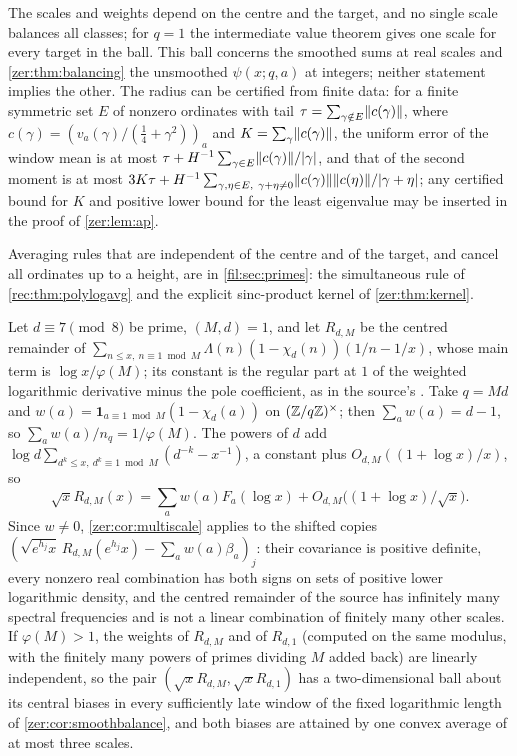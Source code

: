 The scales and weights depend on the centre and the target, and no single scale balances all
classes; for $q=1$ the intermediate value theorem gives one scale for every target in the
ball. This ball concerns the smoothed sums at real scales and \cref{zer:thm:balancing} the
unsmoothed $\psi(x;q,a)$ at integers; neither statement implies the other. The radius can be
certified from finite data: for a finite symmetric set $E$ of nonzero ordinates with tail
$\tau=\sum_{\gamma\notin E}\lVert c(\gamma)\rVert$, where $c(\gamma)=(v_a(\gamma)/(\tfrac14+\gamma^2))_a$ and
$K=\sum_\gamma\lVert c(\gamma)\rVert$, the uniform error of the window mean is at most
$\tau+H^{-1}\sum_{\gamma\in E}\lVert c(\gamma)\rVert/\lvert\gamma\rvert$, and that of the second moment is at most
$3K\tau+H^{-1}\sum_{\gamma,\eta\in E,\ \gamma+\eta\ne0}\norm{c(\gamma)}\norm{c(\eta)}/\abs{\gamma+\eta}$; any
certified bound for $K$ and positive lower bound for the least eigenvalue may be inserted in
the proof of \cref{zer:lem:ap}.

Averaging rules that are independent of the centre and of the target, and cancel all ordinates up
to a height, are in \cref{fil:sec:primes}: the simultaneous rule of \cref{rec:thm:polylogavg} and the
explicit sinc-product kernel of \cref{zer:thm:kernel}.

\begin{remark}\label{zer:rem:sourceremainder}
Let $d\equiv7\pmod8$ be prime, $(M,d)=1$, and let $R_{d,M}$ be the centred remainder of
$\sum_{n\le x,\ n\equiv1\bmod M}\Lambda(n)(1-\chi_d(n))(1/n-1/x)$, whose main term is
$\log x/\varphi(M)$; its constant is the regular part at $1$ of the weighted logarithmic
derivative minus the pole coefficient, as in the source's . Take $q=Md$ and
$w(a)=\mathbf 1_{a\equiv1\bmod M}(1-\chi_d(a))$ on $(\mathbb{Z}/q\mathbb{Z})^\times$; then $\sum_aw(a)=d-1$, so
$\sum_aw(a)/n_q=1/\varphi(M)$. The powers of $d$ add
$\log d\sum_{d^k\le x,\ d^k\equiv1\bmod M}(d^{-k}-x^{-1})$, a constant plus $O_{d,M}((1+\log x)/x)$, so
\[
 \sqrt xR_{d,M}(x)=\sum_aw(a)F_a(\log x)+O_{d,M}\bigl((1+\log x)/\sqrt x\bigr).
\]
Since $w\ne0$, \cref{zer:cor:multiscale} applies to the shifted copies
$(\sqrt{e^{h_j}x}\,R_{d,M}(e^{h_j}x)-\sum_aw(a)\beta_a)_j$: their covariance is positive definite,
every nonzero real combination has both signs on sets of positive lower logarithmic density,
and the centred remainder of the source has infinitely many spectral frequencies and is not a
linear combination of finitely many other scales. If $\varphi(M)>1$, the weights of $R_{d,M}$ and
of $R_{d,1}$ (computed on the same modulus, with the finitely many powers of primes dividing $M$
added back) are linearly independent, so the pair $(\sqrt xR_{d,M},\sqrt xR_{d,1})$ has a
two-dimensional ball about its central biases in every sufficiently late window of the fixed
logarithmic length of \cref{zer:cor:smoothbalance}, and both biases are attained by one convex
average of at most three scales.
\end{remark}

